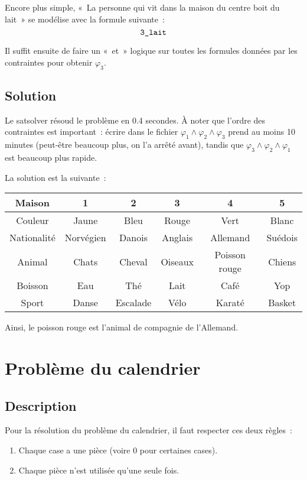 Encore plus simple, «~La personne qui vit dans la maison du centre boit du
lait~» se modélise avec la formule suivante~:
\begin{equation*}
    \verb|3_lait|
\end{equation*}

Il suffit ensuite de faire un «~et~» logique sur toutes les formules données
par les contraintes pour obtenir $\varphi_3$.

\subsection{Solution}
Le satsolver résoud le problème en 0.4 secondes. À noter que l’ordre des
contraintes est important~: écrire dans le fichier
$\varphi_1 \wedge \varphi_2 \wedge \varphi_3$ prend au moins 10 minutes
(peut-être beaucoup plus, on l’a arrêté avant), tandis que
$\varphi_3 \wedge \varphi_2 \wedge \varphi_1$ est beaucoup plus rapide.

La solution est la suivante~:
\begin{center}
\begin{tabular}{|c|c|c|c|c|c|}
    \hline
    Maison      & 1         & 2         & 3       & 4             & 5 \\
    \hline
    Couleur     & Jaune     & Bleu      & Rouge   & Vert          & Blanc \\
    \hline
    Nationalité & Norvégien & Danois    & Anglais & Allemand      & Suédois \\
    \hline
    Animal      & Chats     & Cheval    & Oiseaux & Poisson rouge & Chiens \\
    \hline
    Boisson     & Eau       & Thé       & Lait    & Café          & Yop \\
    \hline
    Sport       & Danse     & Escalade  & Vélo    & Karaté        & Basket \\
    \hline
\end{tabular}
\end{center}

Ainsi, le poisson rouge est l’animal de compagnie de l’Allemand.


\section{Problème du calendrier}
\subsection{Description}
Pour la résolution du problème du calendrier, il faut respecter ces deux
règles~:
\begin{enumerate}
    \item Chaque case a une pièce (voire 0 pour certaines cases).
    \item Chaque pièce n'est utilisée qu'une seule fois.
\end{enumerate}

